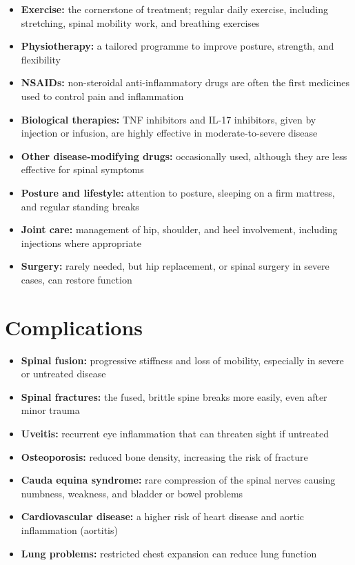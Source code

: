\begin{itemize}
    \item \textbf{Exercise:} the cornerstone of treatment; regular daily exercise, including stretching, spinal mobility work, and breathing exercises
    \item \textbf{Physiotherapy:} a tailored programme to improve posture, strength, and flexibility
    \item \textbf{NSAIDs:} non-steroidal anti-inflammatory drugs are often the first medicines used to control pain and inflammation
    \item \textbf{Biological therapies:} TNF inhibitors and IL-17 inhibitors, given by injection or infusion, are highly effective in moderate-to-severe disease
    \item \textbf{Other disease-modifying drugs:} occasionally used, although they are less effective for spinal symptoms
    \item \textbf{Posture and lifestyle:} attention to posture, sleeping on a firm mattress, and regular standing breaks
    \item \textbf{Joint care:} management of hip, shoulder, and heel involvement, including injections where appropriate
    \item \textbf{Surgery:} rarely needed, but hip replacement, or spinal surgery in severe cases, can restore function
\end{itemize}

\section*{Complications}
\begin{itemize}
    \item \textbf{Spinal fusion:} progressive stiffness and loss of mobility, especially in severe or untreated disease
    \item \textbf{Spinal fractures:} the fused, brittle spine breaks more easily, even after minor trauma
    \item \textbf{Uveitis:} recurrent eye inflammation that can threaten sight if untreated
    \item \textbf{Osteoporosis:} reduced bone density, increasing the risk of fracture
    \item \textbf{Cauda equina syndrome:} rare compression of the spinal nerves causing numbness, weakness, and bladder or bowel problems
    \item \textbf{Cardiovascular disease:} a higher risk of heart disease and aortic inflammation (aortitis)
    \item \textbf{Lung problems:} restricted chest expansion can reduce lung function
\end{itemize}

